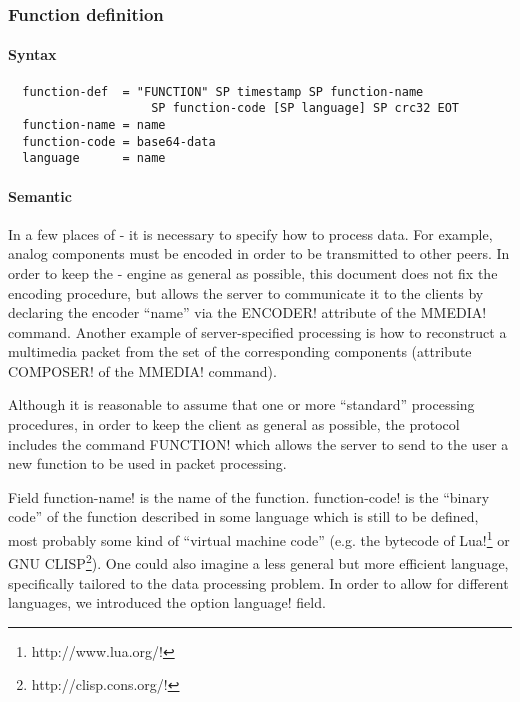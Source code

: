 \documentclass{medusabook}
\begin{document}
\subsubsection{Function definition}
\label{subsub:1.3.1.5;medusa_book}

\paragraph{Syntax}
\begin{verbatim}
  function-def  = "FUNCTION" SP timestamp SP function-name 
                    SP function-code [SP language] SP crc32 EOT
  function-name = name
  function-code = base64-data
  language      = name
\end{verbatim}

\paragraph{Semantic}

In a few places of \medusa- it is necessary to specify how to process
data.  For example, analog components must be encoded in order to be
transmitted to other peers.  In order to keep the \medusa- engine as
general as possible, this document does not fix the encoding
procedure, but allows the server to communicate it to the clients by
declaring the encoder ``name'' via the \ttt ENCODER! attribute of the
\ttt MMEDIA! command.  Another example of server-specified processing
is how to reconstruct a multimedia packet from the set of the
corresponding components (attribute \ttt COMPOSER! of the \ttt MMEDIA!
command). 

Although it is reasonable to assume that one or more ``standard''
processing procedures, in order to keep the client as general as
possible, the protocol includes the command \ttt FUNCTION!  which
allows the server to send to the user a new function to be used in
packet processing.

Field \ttt function-name! is the name of the function.  \ttt
function-code! is the ``binary code'' of the function described in
some language which is still to be defined, most probably some kind of
``virtual machine code'' (e.g. the bytecode of \ttt Lua!\footnote{\ttt
http://www.lua.org/!} or GNU CLISP\footnote{\ttt
http://clisp.cons.org/!}).  One could also imagine a less general
but more efficient language, specifically tailored to the data
processing problem.  In order to allow for different languages, we
introduced the option \ttt language! field.
\end{document}
